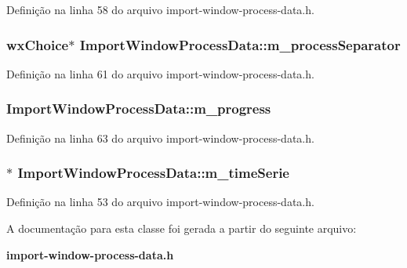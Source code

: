 Definição na linha 58 do arquivo import-\/window-\/process-\/data.\+h.

\subsubsection[{m\+\_\+process\+Separator}]{\setlength{\rightskip}{0pt plus 5cm}wx\+Choice$\ast$ Import\+Window\+Process\+Data\+::m\+\_\+process\+Separator\hspace{0.3cm}{\ttfamily [protected]}}\label{class_import_window_process_data_a0325bd257eeb4652e8c1c2abf985888e}


Definição na linha 61 do arquivo import-\/window-\/process-\/data.\+h.

\subsubsection[{m\+\_\+progress}]{ Import\+Window\+Process\+Data\+::m\+\_\+progress\hspace{0.3cm}{\ttfamily [protected]}}\label{class_import_window_process_data_a65360d8e68e2b44702210ccf8fa0a0c4}


Definição na linha 63 do arquivo import-\/window-\/process-\/data.\+h.

\subsubsection[{m\+\_\+time\+Serie}]{$\ast$ Import\+Window\+Process\+Data\+::m\+\_\+time\+Serie\hspace{0.3cm}{\ttfamily [protected]}}\label{class_import_window_process_data_a5ac35e04986d90d6969b834fbc53c53a}


Definição na linha 53 do arquivo import-\/window-\/process-\/data.\+h.



A documentação para esta classe foi gerada a partir do seguinte arquivo\+:\begin{DoxyCompactItemize}
\item 
{\bf import-\/window-\/process-\/data.\+h}\end{DoxyCompactItemize}
